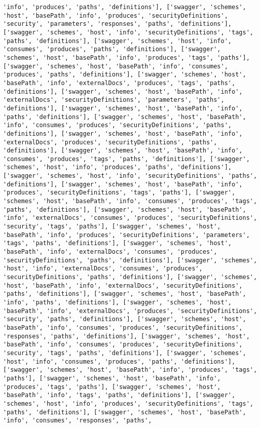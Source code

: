 \documentclass[11pt]{article}
\begin{document}
\begin{Verbatim}[commandchars=\\\{\}]
'info', 'produces', 'paths', 'definitions'], ['swagger', 'schemes', 'host', 'basePath', 'info', 'produces', 'securityDefinitions', 'security', 'parameters', 'responses', 'paths', 'definitions'], ['swagger', 'schemes', 'host', 'info', 'securityDefinitions', 'tags', 'paths', 'definitions'], ['swagger', 'schemes', 'host', 'info', 'consumes', 'produces', 'paths', 'definitions'], ['swagger', 'schemes', 'host', 'basePath', 'info', 'produces', 'tags', 'paths'], ['swagger', 'schemes', 'host', 'basePath', 'info', 'consumes', 'produces', 'paths', 'definitions'], ['swagger', 'schemes', 'host', 'basePath', 'info', 'externalDocs', 'produces', 'tags', 'paths', 'definitions'], ['swagger', 'schemes', 'host', 'basePath', 'info', 'externalDocs', 'securityDefinitions', 'parameters', 'paths', 'definitions'], ['swagger', 'schemes', 'host', 'basePath', 'info', 'paths', 'definitions'], ['swagger', 'schemes', 'host', 'basePath', 'info', 'consumes', 'produces', 'securityDefinitions', 'paths', 'definitions'], ['swagger', 'schemes', 'host', 'basePath', 'info', 'externalDocs', 'produces', 'securityDefinitions', 'paths', 'definitions'], ['swagger', 'schemes', 'host', 'basePath', 'info', 'consumes', 'produces', 'tags', 'paths', 'definitions'], ['swagger', 'schemes', 'host', 'info', 'produces', 'paths', 'definitions'], ['swagger', 'schemes', 'host', 'info', 'securityDefinitions', 'paths', 'definitions'], ['swagger', 'schemes', 'host', 'basePath', 'info', 'produces', 'securityDefinitions', 'tags', 'paths'], ['swagger', 'schemes', 'host', 'basePath', 'info', 'consumes', 'produces', 'tags', 'paths', 'definitions'], ['swagger', 'schemes', 'host', 'basePath', 'info', 'externalDocs', 'consumes', 'produces', 'securityDefinitions', 'security', 'tags', 'paths'], ['swagger', 'schemes', 'host', 'basePath', 'info', 'produces', 'securityDefinitions', 'parameters', 'tags', 'paths', 'definitions'], ['swagger', 'schemes', 'host', 'basePath', 'info', 'externalDocs', 'consumes', 'produces', 'securityDefinitions', 'paths', 'definitions'], ['swagger', 'schemes', 'host', 'info', 'externalDocs', 'consumes', 'produces', 'securityDefinitions', 'paths', 'definitions'], ['swagger', 'schemes', 'host', 'basePath', 'info', 'externalDocs', 'securityDefinitions', 'paths', 'definitions'], ['swagger', 'schemes', 'host', 'basePath', 'info', 'paths', 'definitions'], ['swagger', 'schemes', 'host', 'basePath', 'info', 'externalDocs', 'produces', 'securityDefinitions', 'security', 'paths', 'definitions'], ['swagger', 'schemes', 'host', 'basePath', 'info', 'consumes', 'produces', 'securityDefinitions', 'responses', 'paths', 'definitions'], ['swagger', 'schemes', 'host', 'basePath', 'info', 'consumes', 'produces', 'securityDefinitions', 'security', 'tags', 'paths', 'definitions'], ['swagger', 'schemes', 'host', 'info', 'consumes', 'produces', 'paths', 'definitions'], ['swagger', 'schemes', 'host', 'basePath', 'info', 'produces', 'tags', 'paths'], ['swagger', 'schemes', 'host', 'basePath', 'info', 'produces', 'tags', 'paths'], ['swagger', 'schemes', 'host', 'basePath', 'info', 'tags', 'paths', 'definitions'], ['swagger', 'schemes', 'host', 'info', 'produces', 'securityDefinitions', 'tags', 'paths', 'definitions'], ['swagger', 'schemes', 'host', 'basePath', 'info', 'consumes', 'responses', 'paths', 
\end{Verbatim}
\end{document}
